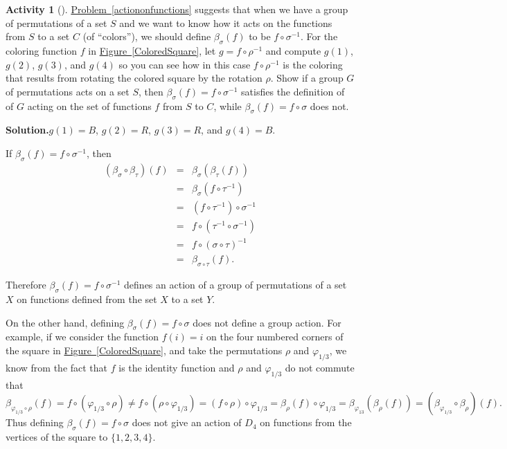 \documentclass[10pt,]{book}
\theoremstyle{plain}
\theoremstyle{definition}
\newtheorem{activity}[project]{Activity}
\numberwithin{equation}{chapter}
\newcommand{\amp}{&}
\begin{document}
\begin{activity}[]\label{actingonfunctions2}
\hyperref[actiononfunctions]{Problem~\ref{actiononfunctions}} suggests that when we have a group of permutations of a set \(S\) and we want to know how it acts on the functions from \(S\) to a set \(C\) (of ``colors''), we should define \(\beta_{\sigma}(f)\) to be \(f\circ\sigma^{-1}\). For the coloring function \(f\) in \hyperref[ColoredSquare]{Figure~\ref{ColoredSquare}}, let \(g=f\circ\rho^{-1}\) and compute \(g(1)\), \(g(2)\), \(g(3)\), and \(g(4)\) so you can see how in this case \(f\circ\rho^{-1}\) is the coloring that results from rotating the colored square by the rotation \(\rho\). Show if a group \(G\) of permutations acts on a set \(S\), then \(\beta_{\sigma}(f) =f\circ\sigma^{-1}\) satisfies the definition of of \(G\) acting on the set of functions \(f\) from \(S\) to \(C\), while \(\beta_{\sigma}(f) =f\circ\sigma\) does not.%
\par\medskip\noindent%
\textbf{Solution.}\quad \(g(1)=B\), \(g(2)=R\), \(g(3)=R\), and \(g(4)=B\).%
\par
If \(\beta_{\sigma}(f) = f\circ\sigma^{-1}\), then%
\begin{align*}
(\beta_{\sigma}\circ\beta_{\tau})(f)\amp =\amp \beta_{\sigma}(\beta_{\tau}(f))\\
\amp =\amp
\beta_{\sigma}(f\circ \tau^{-1})\\
\amp =\amp (f\circ\tau^{-1})\circ\sigma^{-1}\\
\amp =\amp
f\circ(\tau^{-1}\circ \sigma^{-1})\\
\amp =\amp  f\circ (\sigma\circ\tau)^{-1}\\
\amp =\amp \beta_{\sigma\circ\tau}(f).
\end{align*}
%
\par
Therefore \(\beta_{\sigma}(f) = f\circ\sigma^{-1}\) defines an action of a group of permutations of a set \(X\) on functions defined from the set \(X\) to a set \(Y\).%
\par
On the other hand, defining \(\beta_{\sigma}(f) = f\circ\sigma\) does not define a group action. For example, if we consider the function \(f(i)=i\) on the four numbered corners of the square in \hyperref[ColoredSquare]{Figure~\ref{ColoredSquare}}, and take the permutations \(\rho\) and \(\varphi_{1/3}\), we know from the fact that \(f\) is the identity function and \(\rho\) and \(\varphi_{1/3}\) do not commute that \(\beta_{\varphi_{1/3}\circ\rho}(f) = f\circ(\varphi_{1/3}\circ\rho)\not =
f\circ(\rho\circ\varphi_{1/3})=(f\circ\rho)\circ\varphi_{1/3}=\beta_{\rho}(f)
\circ\varphi_{1/3}= \beta_{\varphi_{13}}(\beta_\rho(f)) =(\beta_{\varphi_{1/3}}\circ
\beta_{\rho})(f).\) Thus defining \(\beta_\sigma(f)= f\circ \sigma\) does not give an action of \(D_4\) on functions from the vertices of the square to \(\{1,2,3,4\}\).%
\end{activity}
\end{document}
